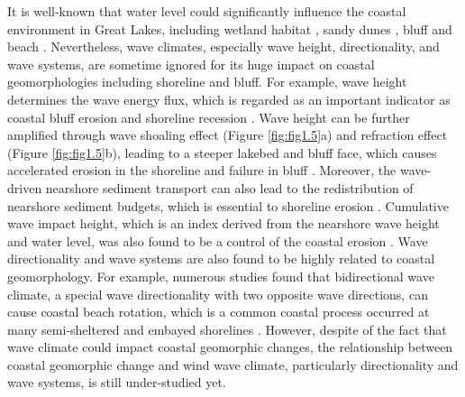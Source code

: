 It is well-known that water level could significantly influence the coastal
environment in Great Lakes, including wetland habitat
\citep{hohman_influence_2021,anderson_influence_2023}, sandy dunes
\citep{arbogast_maximum-limiting_1999,kilibarda_70year_2015}, bluff
\citep{volpano_three-dimensional_2020} and beach \citep{scholle_responses_2022}.
Nevertheless, wave climates, especially wave height, directionality, and wave
systems, are sometime ignored for its huge impact on coastal geomorphologies
including shoreline and bluff. For example, wave height determines the wave
energy flux, which is regarded as an important indicator as coastal bluff
erosion and shoreline recession
\citep{benumof_relationship_2000,galal_influence_2011}. Wave height can be
further amplified through wave shoaling effect (Figure \ref{fig:fig1.5}a) and
refraction effect (Figure \ref{fig:fig1.5}b), leading to a steeper lakebed and
bluff face, which causes accelerated erosion in the shoreline and failure in
bluff \citep{booth_wave_1994}. Moreover, the wave-driven nearshore sediment
transport can also lead to the redistribution of nearshore sediment budgets,
which is essential to shoreline erosion
\citep{amin_statistical_1997,usace_cem_2002,adams_effects_2011,dean2004coastal}.
Cumulative wave impact height, which is an index derived from the nearshore wave
height and water level, was also found to be a control of the coastal erosion
\citep{ruggiero_wave_2001,swenson_bluff_2006}. Wave directionality and wave
systems are also found to be highly related to coastal geomorphology. For
example, numerous studies found that bidirectional wave climate, a special wave
directionality with two opposite wave directions, can cause coastal beach
rotation, which is a common coastal process occurred at many semi-sheltered and
embayed shorelines
\citep{klein_short-term_2002,wiggins_coastal_2019,wiggins_regionally-coherent_2019,loureiro_24_2020}.
However, despite of the fact that wave climate could impact coastal geomorphic
changes, the relationship between coastal geomorphic change and wind wave
climate, particularly directionality and wave systems, is still under-studied
yet. 

